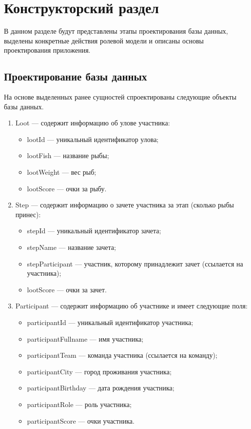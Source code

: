 \section{Конструкторский раздел} \label{desing}

В данном разделе будут представлены этапы проектирования базы данных, выделены конкретные действия ролевой модели и описаны основы проектирования приложения.

\subsection{Проектирование базы данных}

На основе выделенных ранее сущностей спроектированы следующие объекты базы данных.
\begin{enumerate}
	\item Loot --- содержит информацию об улове участника:
	\begin{itemize}[label=---]
		\item lootId --- уникальный идентификатор улова;
		\item lootFish --- название рыбы;
		\item lootWeight --- вес рыб;
		\item lootScore --- очки за рыбу.
	\end{itemize}
	
	\item Step --- содержит информацию о зачете участника за этап (сколько рыбы принес):
	\begin{itemize}[label=---]
		\item stepId --- уникальный идентификатор зачета;
		\item stepName --- название зачета;
		\item stepParticipant --- участник, которому принадлежит зачет (ссылается на участника); 
		\item lootScore --- очки за зачет.
	\end{itemize}
	
	\item Participant --- содержит информацию об участнике и имеет следующие поля:
	\begin{itemize}[label=---]
		\item participantId --- уникальный идентификатор участника;
		\item participantFullname --- имя участника;
		\item participantTeam --- команда участника (ссылается на команду);
		\item participantCity ---  город проживания участника;
		\item participantBirthday --- дата рождения участника;
		\item participantRole --- роль участника;
		\item participantScore --- очки участника.
	\end{itemize}
	

\end{enumerate}
